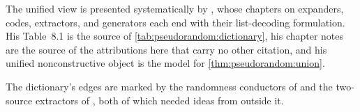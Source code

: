 \begin{refsection}
\begin{exercises}
\end{exercises}

\notesandrefs
The unified view is presented systematically by \textcite{Vadhan2012}, whose chapters on expanders, codes, extractors, and generators each end with their list-decoding formulation. His Table~8.1 is the source of \cref{tab:pseudorandom:dictionary}, his chapter notes are the source of the attributions here that carry no other citation, and his unified nonconstructive object is the model for \cref{thm:pseudorandom:union}.

The dictionary's edges are marked by the randomness conductors of \textcite{CapalboReingoldVadhanWigderson2002} and the two-source extractors of \textcite{ChattopadhyayZuckerman2019}, both of which needed ideas from outside it.

\printchapterbib
\end{refsection}
